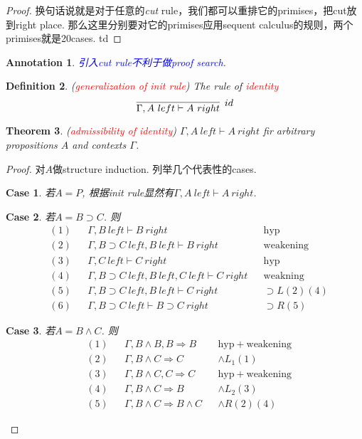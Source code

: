 \documentclass{article}
\theoremstyle{plain}
\newtheorem{theorem}{Theorem}
\newtheorem{definition}[theorem]{Definition}
\newtheorem{annotation}[theorem]{Annotation}
\newtheorem{case}{Case}
\theoremstyle{nonumberplain}
\newtheorem{proof}{Proof}
\newcommand{\redt}[1]{\textcolor{red}{#1}}
\newcommand{\bluet}[1]{\textcolor{blue}{#1}}
\begin{document}
\begin{proof}
换句话说就是对于任意的\emph{cut} rule，我们都可以重排它的primises，把cut放到right place. 那么这里分别要对它的primises应用sequent calculus的规则，两个primises就是20cases. td
\end{proof}


\begin{annotation}
\rm \bluet{引入\emph{cut} rule不利于做proof search}. 
\end{annotation}


\begin{definition}\label{identity-rule}
\rm (\redt{generalization of \emph{init} rule}) The rule of \redt{identity}
$$
\infer[id]{\Gamma, A~left \vdash A~right}{}
$$
\end{definition}

\begin{theorem}
\rm (\redt{admissibility of identity}) $\Gamma, A~left \vdash A~right$ fir arbitrary propositions $A$ and contexts $\Gamma$.
\end{theorem}

\begin{proof}
\rm 对$A$做structure induction. 列举几个代表性的cases.
\begin{case}若$A = P$, 根据\emph{init} rule显然有$\Gamma,A~left \vdash A~right$.
\end{case}
\begin{case}若$A = B \supset C$. 则
$$
\begin{aligned}
&(1) && \Gamma, B~left \vdash B~right && \text{hyp} \\
&(2) && \Gamma, B \supset C~left, B~left \vdash B~right && \text{weakening} \\
&(3) && \Gamma, C~left \vdash C~right && \text{hyp} \\
&(4) && \Gamma, B \supset C~left, B~left,C~left \vdash C~right && \text{weakning} \\
&(5) && \Gamma, B \supset C~left, B~left \vdash C~right && \supset L (2)(4)\\
&(6) && \Gamma, B \supset C~left \vdash B \supset C~right&& \supset R(5)
\end{aligned}
$$
\end{case}
\begin{case}若$A = B \wedge C$. 则
$$
\begin{aligned}
&(1) && \Gamma, B \wedge B, B \Rightarrow B &&  \text{hyp}~+~\text{weakening} \\ 
&(2) && \Gamma, B \wedge C \Rightarrow C && \wedge L_1(1)\\
&(3) && \Gamma, B \wedge C, C \Rightarrow C &&  \text{hyp}~+~\text{weakening}\\
&(4) && \Gamma, B \wedge C \Rightarrow B && \wedge L_2(3)\\
&(5) && \Gamma, B \wedge C \Rightarrow B \wedge C && \wedge R(2)(4) 
\end{aligned}
$$
\end{case}
\end{proof}
\end{document}
